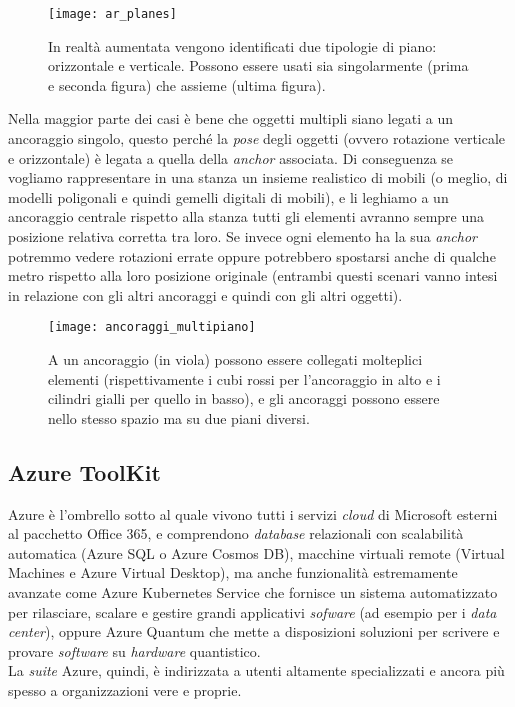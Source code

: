 \begin{figure}[H]
  \centering
  \texttt{[image: ar\_planes]}
  \caption[Piani in realtà aumentata]{In realtà aumentata vengono identificati due tipologie di piano: orizzontale e verticale. Possono essere usati sia singolarmente (prima e seconda figura) che assieme (ultima figura).}
\end{figure}

Nella maggior parte dei casi è bene che oggetti multipli siano legati a un ancoraggio singolo, questo perché la \textit{pose} degli oggetti (ovvero rotazione verticale e orizzontale) è legata a quella della \textit{anchor} associata. Di conseguenza se vogliamo rappresentare in una stanza un insieme realistico di mobili (o meglio, di modelli poligonali e quindi gemelli digitali di mobili), e li leghiamo a un ancoraggio centrale rispetto alla stanza tutti gli elementi avranno sempre una posizione relativa corretta tra loro. Se invece ogni elemento ha la sua \textit{anchor} potremmo vedere rotazioni errate oppure potrebbero spostarsi anche di qualche metro rispetto alla loro posizione originale (entrambi questi scenari vanno intesi in relazione con gli altri ancoraggi e quindi con gli altri oggetti).

\begin{figure}[H]
  \centering
  \texttt{[image: ancoraggi\_multipiano]}
  \caption[Ancoraggi singoli per multipli elementi]{A un ancoraggio (in viola) possono essere collegati molteplici elementi (rispettivamente i cubi rossi per l'ancoraggio in alto e i cilindri gialli per quello in basso), e gli ancoraggi possono essere nello stesso spazio ma su due piani diversi.}
\end{figure}

\subsection{Azure ToolKit}
\label{subsec:azure}
Azure è l'ombrello sotto al quale vivono tutti i servizi \textit{cloud} di Microsoft esterni al pacchetto Office 365, e comprendono \textit{database} relazionali con scalabilità automatica (Azure SQL o Azure Cosmos DB), macchine virtuali remote (Virtual Machines e Azure Virtual Desktop), ma anche funzionalità estremamente avanzate come Azure Kubernetes Service che fornisce un sistema automatizzato per rilasciare, scalare e gestire grandi applicativi \textit{sofware} (ad esempio per i \textit{data center}), oppure Azure Quantum che mette a disposizioni soluzioni per scrivere e provare \textit{software} su \textit{hardware} quantistico.\\
La \textit{suite} Azure, quindi, è indirizzata a utenti altamente specializzati e ancora più spesso a organizzazioni vere e proprie.

